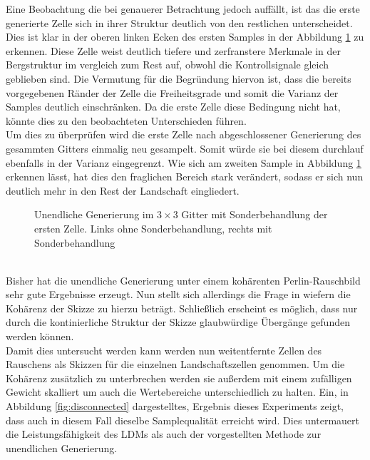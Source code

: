 Eine Beobachtung die bei genauerer Betrachtung jedoch auffällt, ist das die erste generierte Zelle sich in ihrer Struktur deutlich von den restlichen unterscheidet. Dies ist klar in der oberen linken Ecken des ersten Samples in der Abbildung \ref{fig:1st_regen} zu erkennen. Diese Zelle weist deutlich tiefere und zerfranstere Merkmale in der Bergstruktur im vergleich zum Rest auf, obwohl die Kontrollsignale gleich geblieben sind. Die Vermutung für die Begründung hiervon ist, dass die bereits vorgegebenen Ränder der Zelle die Freiheitsgrade und somit die Varianz der Samples deutlich einschränken. Da die erste Zelle diese Bedingung nicht hat, könnte dies zu den beobachteten Unterschieden führen. \\ 
Um dies zu überprüfen wird die erste Zelle nach abgeschlossener Generierung des gesammten Gitters einmalig neu gesampelt. Somit würde sie bei diesem durchlauf ebenfalls in der Varianz eingegrenzt. Wie sich am zweiten Sample in Abbildung \ref{fig:1st_regen} erkennen lässt, hat dies den fraglichen Bereich stark verändert, sodass er sich nun deutlich mehr in den Rest der Landschaft eingliedert. 
\begin{figure}[htbp]
    \centering
    \caption{Unendliche Generierung im $3\times3$ Gitter mit Sonderbehandlung der ersten Zelle. Links ohne Sonderbehandlung, rechts mit Sonderbehandlung}
    \label{fig:1st_regen}
\end{figure} \\
Bisher hat die unendliche Generierung unter einem kohärenten Perlin-Rauschbild sehr gute Ergebnisse erzeugt. Nun stellt sich allerdings die Frage in wiefern die Kohärenz der Skizze zu hierzu beträgt. Schließlich erscheint es möglich, dass nur durch die kontinierliche Struktur der Skizze glaubwürdige Übergänge gefunden werden können. \\
Damit dies untersucht werden kann werden nun weitentfernte Zellen des Rauschens als Skizzen für die einzelnen Landschaftszellen genommen. Um die Kohärenz zusätzlich zu unterbrechen werden sie außerdem mit einem zufälligen Gewicht skalliert um auch die Wertebereiche unterschiedlich zu halten. Ein, in Abbildung \ref{fig:disconnected} dargestelltes, Ergebnis dieses Experiments zeigt, dass auch in diesem Fall dieselbe Samplequalität erreicht wird. Dies untermauert die Leistungsfähigkeit des LDMs als auch der vorgestellten Methode zur unendlichen Generierung.  

